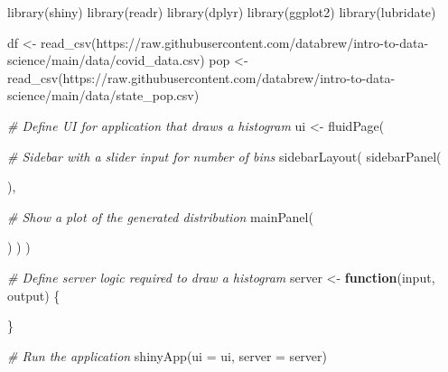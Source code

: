 \documentclass[
]{book}
\newenvironment{Shaded}{\begin{snugshade}}{\end{snugshade}}
\newcommand{\AttributeTok}[1]{\textcolor[rgb]{0.77,0.63,0.00}{#1}}
\newcommand{\CommentTok}[1]{\textcolor[rgb]{0.56,0.35,0.01}{\textit{#1}}}
\newcommand{\ControlFlowTok}[1]{\textcolor[rgb]{0.13,0.29,0.53}{\textbf{#1}}}
\newcommand{\FunctionTok}[1]{\textcolor[rgb]{0.00,0.00,0.00}{#1}}
\newcommand{\NormalTok}[1]{#1}
\newcommand{\OtherTok}[1]{\textcolor[rgb]{0.56,0.35,0.01}{#1}}
\newcommand{\StringTok}[1]{\textcolor[rgb]{0.31,0.60,0.02}{#1}}
\begin{document}
\begin{Shaded}
\begin{Highlighting}[]
\FunctionTok{library}\NormalTok{(shiny)}
\FunctionTok{library}\NormalTok{(readr)}
\FunctionTok{library}\NormalTok{(dplyr)}
\FunctionTok{library}\NormalTok{(ggplot2)}
\FunctionTok{library}\NormalTok{(lubridate)}


\NormalTok{df }\OtherTok{\textless{}{-}} \FunctionTok{read\_csv}\NormalTok{(}\StringTok{\textquotesingle{}https://raw.githubusercontent.com/databrew/intro{-}to{-}data{-}science/main/data/covid\_data.csv\textquotesingle{}}\NormalTok{)}
\NormalTok{pop }\OtherTok{\textless{}{-}} \FunctionTok{read\_csv}\NormalTok{(}\StringTok{\textquotesingle{}https://raw.githubusercontent.com/databrew/intro{-}to{-}data{-}science/main/data/state\_pop.csv\textquotesingle{}}\NormalTok{)}

\CommentTok{\# Define UI for application that draws a histogram}
\NormalTok{ui }\OtherTok{\textless{}{-}} \FunctionTok{fluidPage}\NormalTok{(}

    \CommentTok{\# Sidebar with a slider input for number of bins}
    \FunctionTok{sidebarLayout}\NormalTok{(}
        \FunctionTok{sidebarPanel}\NormalTok{(}

\NormalTok{        ),}

        \CommentTok{\# Show a plot of the generated distribution}
        \FunctionTok{mainPanel}\NormalTok{(}

\NormalTok{        )}
\NormalTok{    )}
\NormalTok{)}

\CommentTok{\# Define server logic required to draw a histogram}
\NormalTok{server }\OtherTok{\textless{}{-}} \ControlFlowTok{function}\NormalTok{(input, output) \{}


\NormalTok{\}}

\CommentTok{\# Run the application}
\FunctionTok{shinyApp}\NormalTok{(}\AttributeTok{ui =}\NormalTok{ ui, }\AttributeTok{server =}\NormalTok{ server)}
\end{Highlighting}
\end{Shaded}
\end{document}
